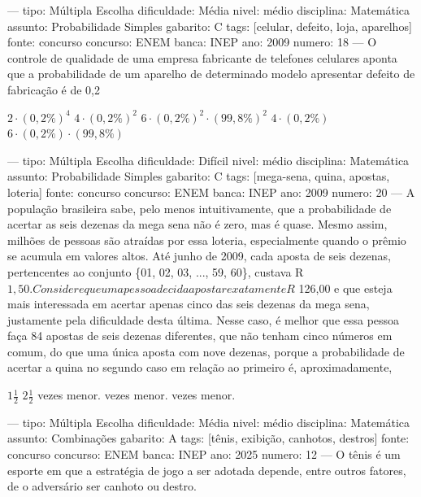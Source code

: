---
tipo: Múltipla Escolha
dificuldade: Média
nivel: médio
disciplina: Matemática
assunto: Probabilidade Simples
gabarito: C
tags: [celular, defeito, loja, aparelhos]
fonte: concurso
concurso: ENEM
banca: INEP
ano: 2009
numero: 18
---
\question
O controle de qualidade de uma empresa fabricante de telefones celulares aponta que a probabilidade de um aparelho de determinado modelo apresentar defeito de fabricação é de 0,2%
\begin{choices}
\choice \( 2 \cdot (0,2\%)^4 \)
\choice \( 4 \cdot (0,2\%)^2 \)
\correctchoice \( 6 \cdot (0,2\%)^2 \cdot (99,8\%)^2 \)
\choice \( 4 \cdot (0,2\%) \)
\choice \( 6 \cdot (0,2\%) \cdot (99,8\%) \)
\end{choices}

---
tipo: Múltipla Escolha
dificuldade: Difícil
nivel: médio
disciplina: Matemática
assunto: Probabilidade Simples
gabarito: C
tags: [mega-sena, quina, apostas, loteria]
fonte: concurso
concurso: ENEM
banca: INEP
ano: 2009
numero: 20
---
\question
A população brasileira sabe, pelo menos intuitivamente, que a probabilidade de acertar as seis dezenas da mega sena não é zero, mas é quase. Mesmo assim, milhões de pessoas são atraídas por essa loteria, especialmente quando o prêmio se acumula em valores altos. Até junho de 2009, cada aposta de seis dezenas, pertencentes ao conjunto \{01, 02, 03, ..., 59, 60\}, custava R$ 1,50.

Considere que uma pessoa decida apostar exatamente R$ 126,00 e que esteja mais interessada em acertar apenas cinco das seis dezenas da mega sena, justamente pela dificuldade desta última. Nesse caso, é melhor que essa pessoa faça 84 apostas de seis dezenas diferentes, que não tenham cinco números em comum, do que uma única aposta com nove dezenas, porque a probabilidade de acertar a quina no segundo caso em relação ao primeiro é, aproximadamente,
\begin{choices}
\choice \( 1\frac{1}{2} \)
\choice \( 2\frac{1}{2} \)
 vezes menor.
 vezes menor.
 vezes menor.
\end{choices}

---
tipo: Múltipla Escolha
dificuldade: Média
nivel: médio
disciplina: Matemática
assunto: Combinações
gabarito: A
tags: [tênis, exibição, canhotos, destros]
fonte: concurso
concurso: ENEM
banca: INEP
ano: 2025
numero: 12
---
\question
O tênis é um esporte em que a estratégia de jogo a ser adotada depende, entre outros fatores, de o adversário ser canhoto ou destro.

